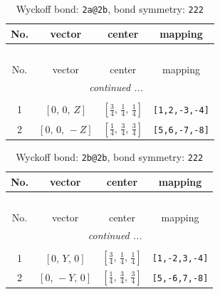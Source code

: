 \documentclass[fleqn,8pt]{jsarticle}
\begin{document}
\begin{longtable}{cccc}
\caption{Wyckoff bond: {\tt 2a@2b}, bond symmetry: {\tt 222}}
 \\
 \hline \hline
No. & vector & center & mapping \\ \hline \endfirsthead

\multicolumn{3}{l}{\tablename\ \thetable{}} \\
 \hline \hline
No. & vector & center & mapping \\ \hline \endhead

 \hline \hline
\multicolumn{3}{r}{\footnotesize\it continued ...} \\ \endfoot

 \hline \hline
\multicolumn{3}{r}{} \\ \endlastfoot

1 & $\left[ 0,\, 0,\, Z \right]$ & $\left[ \frac{3}{4},\, \frac{1}{4},\, \frac{1}{4} \right]$ & {\tt [1,2,-3,-4]} \\ \hline
2 & $\left[ 0,\, 0,\, - Z \right]$ & $\left[ \frac{1}{4},\, \frac{3}{4},\, \frac{3}{4} \right]$ & {\tt [5,6,-7,-8]} \\
\end{longtable}
\renewcommand{\arraystretch}{1.2}
\begin{longtable}{cccc}
\caption{Wyckoff bond: {\tt 2b@2b}, bond symmetry: {\tt 222}}
 \\
 \hline \hline
No. & vector & center & mapping \\ \hline \endfirsthead

\multicolumn{3}{l}{\tablename\ \thetable{}} \\
 \hline \hline
No. & vector & center & mapping \\ \hline \endhead

 \hline \hline
\multicolumn{3}{r}{\footnotesize\it continued ...} \\ \endfoot

 \hline \hline
\multicolumn{3}{r}{} \\ \endlastfoot

1 & $\left[ 0,\, Y,\, 0 \right]$ & $\left[ \frac{3}{4},\, \frac{1}{4},\, \frac{1}{4} \right]$ & {\tt [1,-2,3,-4]} \\ \hline
2 & $\left[ 0,\, - Y,\, 0 \right]$ & $\left[ \frac{1}{4},\, \frac{3}{4},\, \frac{3}{4} \right]$ & {\tt [5,-6,7,-8]} \\
\end{longtable}
\renewcommand{\arraystretch}{1.2}
\end{document}
